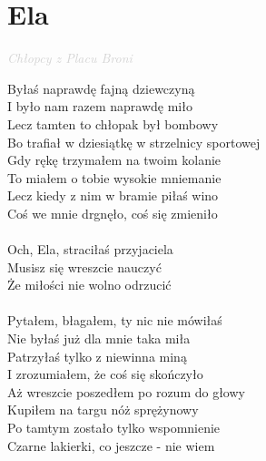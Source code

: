 \documentclass[a5paper, 10pt]{book}
\begin{document}
\newpage
\section{Ela}\textcolor{lightgray}{\textit{Chłopcy z Placu Broni}}\vspace*{2mm}\\
\begin{minipage}[t]{0.8\textwidth}
  Byłaś naprawdę fajną dziewczyną\\
  I było nam razem naprawdę miło\\
  Lecz tamten to chłopak był bombowy\\
  Bo trafiał w dziesiątkę w strzelnicy sportowej\vspace*{2mm}
  \\
  Gdy rękę trzymałem na twoim kolanie\\
  To miałem o tobie wysokie mniemanie\\
  Lecz kiedy z nim w bramie piłaś wino\\
  Coś we mnie drgnęło, coś się zmieniło\\
  \\
  \hspace*{5mm}Och, Ela, straciłaś przyjaciela\\
  \hspace*{5mm}Musisz się wreszcie nauczyć\\
  \hspace*{5mm}Że miłości nie wolno odrzucić\\
  \\
  Pytałem, błagałem, ty nic nie mówiłaś\\
  Nie byłaś już dla mnie taka miła\\
  Patrzyłaś tylko z niewinna miną\\
  I zrozumiałem, że coś się skończyło\vspace*{2mm}
  \\
  Aż wreszcie poszedłem po rozum do głowy\\
  Kupiłem na targu nóż sprężynowy\\
  Po tamtym zostało tylko wspomnienie\\
  Czarne lakierki, co jeszcze - nie wiem\\
\end{minipage}
\end{document}

